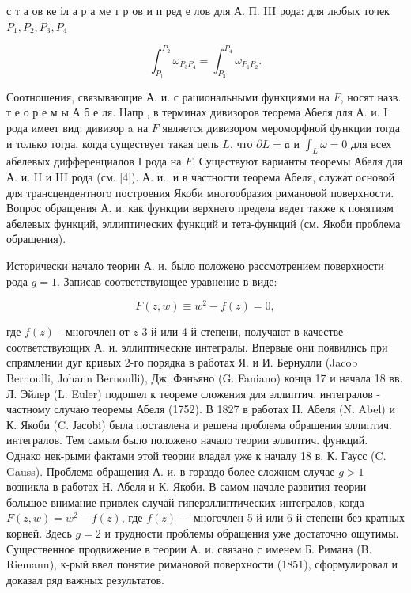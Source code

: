 \documentclass[10pt]{article}
\begin{document}
с т а ов ке іл а р а ме т р ов и п ред е лов для А. П. III рода: для любых точек $P_{1}, P_{2}, P_{3}, P_{4}$



\[

\int_{P_{1}}^{P_{2}} \omega_{P_{3} P_{4}}=\int_{P_{3}}^{P_{4}} \omega_{P_{1} P_{2}} .

\]



Соотношения, связывающие А. и. с рациональными функциями на $F$, носят назв. т е о р е м ы А б е ля. Напр., в терминах дивизоров теорема Абеля для А. и. I рода имеет вид: дивизор a на $F$ является дивизором мероморфной функции тогда и только тогда, когда существует такая цепь $L$, что $\partial L=\mathfrak{a}$ и $\int_{L} \omega=0$ для всех абелевых дифференциалов I рода на $F$. Существуют варианты теоремы Абеля для А. и. II и III рода (см. [4]). А. и., и в частности теорема Абеля, служат основой для трансцендентного построения Якоби многообразия римановой поверхности. Вопрос обращения А. и. как функции верхнего предела ведет также к понятиям абелевых функций, эллиптических функций и тета-функций (см. Якоби проблема обращения).



Исторически начало теории А. и. было положено рассмотрением поверхности рода $g=1$. Записав соответствующее уравнение в виде:



\[

F(z, w) \equiv w^{2}-f(z)=0,

\]



где $f(z)$ - многочлен от $z$ 3-й или 4-й степени, получают в качестве соответствующих А. и. эллиптические интегралы. Впервые они появились при спрямлении дуг кривых 2-го порядка в работах Я. и И. Бернулли (Jacob Bernoulli, Johann Bernoulli), Дж. Фаньяно (G. Faniano) конца 17 и начала 18 вв. Л. Эйлер (L. Euler) подошел к теореме сложения для эллиптич. интегралов - частному случаю теоремы Абеля (1752). В 1827 в работах Н. Абеля (N. Abel) и К. Якоби (C. Јасоbi) была поставлена и решена проблема обращения эллиптич. интегралов. Тем самым было положено начало теории эллиптич. функций. Однако нек-рыми фактами этой теории владел уже к началу 18 в. К. Гаусс (C. Gauss). Проблема обращения А. и. в гораздо более сложном случае $g>1$ возникла в работах Н. Абеля и К. Якоби. В самом начале развития теории большое внимание привлек случай гиперэллиптических интегралов, когда $F(z, w)=w^{2}-f(z)$, где $f(z)-$ многочлен 5-й или 6-й степени без кратных корней. Здесь $g=2$ и трудности проблемы обращения уже достаточно ощутимы. Существенное продвижение в теории А. и. связано с именем Б. Римана (B. Riemann), к-рый ввел понятие римановой поверхности (1851), сформулировал и доказал ряд важных результатов.
\end{document}
